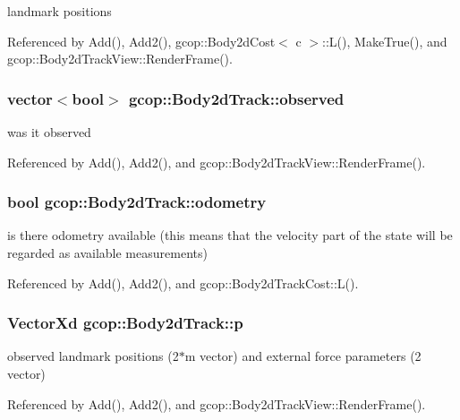 landmark positions 



\-Referenced by \-Add(), \-Add2(), gcop\-::\-Body2d\-Cost$<$ c $>$\-::\-L(), \-Make\-True(), and gcop\-::\-Body2d\-Track\-View\-::\-Render\-Frame().

\subsubsection[{observed}]{\setlength{\rightskip}{0pt plus 5cm}vector$<$bool$>$ {\bf gcop\-::\-Body2d\-Track\-::observed}}\label{classgcop_1_1Body2dTrack_a3f4394572fe88fa8d87b02cd94b6c412}


was it observed 



\-Referenced by \-Add(), \-Add2(), and gcop\-::\-Body2d\-Track\-View\-::\-Render\-Frame().

\subsubsection[{odometry}]{\setlength{\rightskip}{0pt plus 5cm}bool {\bf gcop\-::\-Body2d\-Track\-::odometry}}\label{classgcop_1_1Body2dTrack_a0175c2fd9d3671cb9422ed04b977c238}


is there odometry available (this means that the velocity part of the state will be regarded as available measurements) 



\-Referenced by \-Add(), \-Add2(), and gcop\-::\-Body2d\-Track\-Cost\-::\-L().

\subsubsection[{p}]{\setlength{\rightskip}{0pt plus 5cm}\-Vector\-Xd {\bf gcop\-::\-Body2d\-Track\-::p}}\label{classgcop_1_1Body2dTrack_ae21aa03396bed0cecba10dfd9437c770}


observed landmark positions (2$\ast$m vector) and external force parameters (2 vector) 



\-Referenced by \-Add(), \-Add2(), and gcop\-::\-Body2d\-Track\-View\-::\-Render\-Frame().

